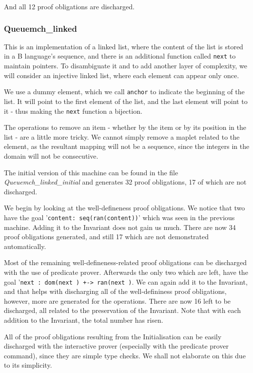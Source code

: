 \documentclass[12pt,journal,duplex]{IEEEtran}
\begin{document}
	And all 12 proof obligations are discharged.

	\subsubsection{Queuemch\_linked}

	This is an implementation of a linked list, where the content of the list is stored in a B language's sequence, and there is an additional function called \texttt{next} to maintain pointers. To disambiguate it and to add another layer of complexity, we will consider an injective linked list, where each element can appear only once.

	We use a dummy element, which we call \texttt{anchor} to indicate the beginning of the list. It will point to the first element of the list, and the last element will point to it - thus making the \texttt{next} function a bijection.

	The operations to remove an item - whether by the item or by its position in the list - are a little more tricky. We cannot simply remove a maplet related to the element, as the resultant mapping will not be a sequence, since the integers in the domain will not be consecutive.

	The initial version of this machine can be found in the file \emph{Queuemch\_linked\_initial} and generates 32 proof obligations, 17 of which are not discharged.

	We begin by looking at the well-defineness proof obligations. We notice that two have the goal '\texttt{content: seq(ran(content))}' which was seen in the previous machine. Adding it to the Invariant does not gain us much. There are now 34 proof obligations generated, and still 17 which are not demonstrated automatically.

	Most of the remaining well-defineness-related proof obligations can be discharged with the use of predicate prover. Afterwards the only two which are left, have the goal '\texttt{next~: dom(next~) +-> ran(next~)}. We can again add it to the Invariant, and that helps with discharging all of the well-defininess proof obligations, however, more are generated for the operations. There are now 16 left to be discharged, all related to the preservation of the Invariant. Note that with each addition to the Invariant, the total number has risen.

	All of the proof obligations resulting from the Initialisation can be easily discharged with the interactive prover (especially with the predicate prover command), since they are simple type checks. We shall not elaborate on this due to its simplicity.
\end{document}
